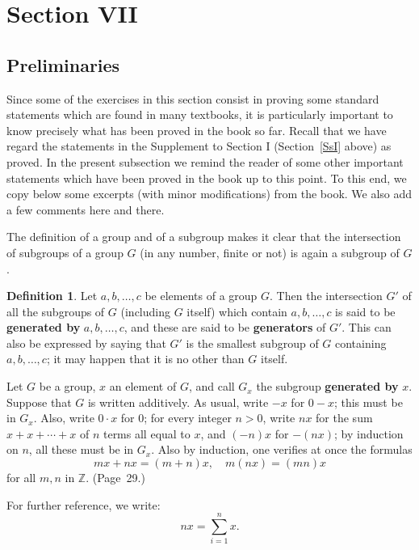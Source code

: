 \documentclass[12pt,letterpaper]{article}
\newcommand{\Z}{\mathbb{Z}}
\theoremstyle{definition}
\newtheorem{defn}[thm]{Definition}
\begin{document}
\section{Section VII} %

\subsection{Preliminaries} %

Since some of the exercises in this section consist in proving some standard statements which are found in many textbooks, it is particularly important to know precisely what has been proved in the book so far. Recall that we have regard the statements in the Supplement to Section I (Section~\ref{SsI} above) as proved. In the present subsection we remind the reader of some other important statements which have been proved in the book up to this point. To this end, we copy below some excerpts (with minor modifications) from the book. We also add a few comments here and there. 

The definition of a group and of a subgroup makes it clear that the intersection of subgroups of a group $G$ (in any number, finite or not) is again a subgroup of $G$.

\begin{defn}\label{Dgen}
Let $a,b,\ldots,c$ be elements of a group $G$. Then the intersection $G'$ of all the subgroups of $G$ (including $G$ itself) which contain $a,b,\ldots,c$ is said to be \textbf{generated by} $a,b,\ldots,c$,  and these are said to be \textbf{generators}  of $G'$. This can also be expressed by saying that $G'$ is the smallest subgroup of $G$ containing $a,b,\ldots,c$; it may happen that it is no other than $G$ itself. 
\end{defn}

Let $G$ be a group, $x$ an element of $G$, and call $G_x$ the subgroup \textbf{generated by} $x$.  Suppose that $G$ is written additively. As usual, write $-x$ for $0-x$; this must be in $G_x$. Also, write $0\cdot x$ for $0$; for every integer $n>0$, write $nx$ for the sum $x+x+\cdots+x$ of $n$ terms all equal to $x$, and $(-n)x$ for $-(nx)$; by induction on $n$, all these must be in $G_x$. Also by induction, one verifies at once the formulas 
$$
mx+nx=(m+n)x,\quad m(nx)=(mn)x
$$
for all $m,n$ in $\Z$. (Page~29.) 

For further reference, we write: 
\begin{equation}\label{Eqnx}
nx=\sum_{i=1}^n x.
\end{equation}
\end{document}

